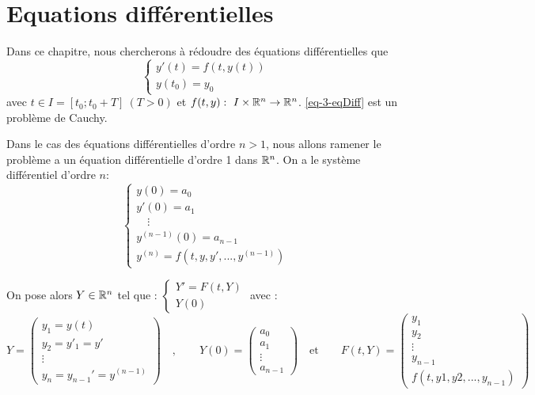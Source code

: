 \chapter{Equations différentielles}
\label{ch-3}


	Dans ce chapitre, nous chercherons à rédoudre des équations différentielles que
	\begin{equation}
		\label{eq-3-eqDiff}
		\begin{cases}
			y'(t) = f(t, y(t)) \\
			y(t_0) = y_0
		\end{cases}
	\end{equation}
	avec $t \in I = [t_0; t_0 + T] ~ (T>0)$ et $f(t,y):~I\times\mathbb{R}^n \to \mathbb{R}^n$.
	\eqref{eq-3-eqDiff} est un problème de Cauchy.

	\bigskip

	Dans le cas des équations différentielles d'ordre $n>1$, nous allons ramener le problème a un équation différentielle d'ordre 1 dans $\mathbb{R}^n$. On a le système différentiel d'ordre $n$:
	\begin{equation}
		\label{eq-3-systDiffRn}
		\begin{cases}
			y(0) = a_0					\\
			y'(0) = a_1					\\
			\quad\vdots 				\\
			y^{(n-1)}(0) = a_{n-1}		\\
			y^{(n)} = f(t, y, y',...,y^{(n-1)})
		\end{cases}
	\end{equation}

	On pose alors $Y\in\mathbb{R}^n$ tel que : \quad
	$
		\begin{cases}
			Y' = F(t,Y)			\\
			Y(0)
		\end{cases}
	$ \quad avec :
	$$
		Y = \begin{pmatrix}
			y_1 = y(t) 	\\
			y_2 = y'_1 = y'		\\
			\vdots 	\\
			y_n = y_{n-1}' = y^{(n-1)}
		\end{pmatrix}
		\quad, \qquad
		Y(0) = \begin{pmatrix}
			a_0	\\
			a_1	\\
			\vdots 	\\
			a_{n-1}
		\end{pmatrix}
		\quad \text{et} \qquad
		F(t,Y) = \begin{pmatrix}
			y_1 	\\
			y_2		\\
			\vdots 	\\
			y_{n-1}	\\
			f(t, y1, y2, ..., y_{n-1})
		\end{pmatrix}
		$$

